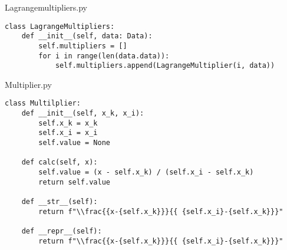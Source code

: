 \documentclass[12pt]{article}
\begin{document}
Lagrangemultipliers.py
\begin{lstlisting}[frame=single]
class LagrangeMultipliers:
    def __init__(self, data: Data):
        self.multipliers = []
        for i in range(len(data.data)):
            self.multipliers.append(LagrangeMultiplier(i, data))
\end{lstlisting}

Multiplier.py
\begin{lstlisting}[frame=single]
class Multilplier:
    def __init__(self, x_k, x_i):
        self.x_k = x_k
        self.x_i = x_i
        self.value = None

    def calc(self, x):
        self.value = (x - self.x_k) / (self.x_i - self.x_k)
        return self.value

    def __str__(self):
        return f"\\frac{{x-{self.x_k}}}{{ {self.x_i}-{self.x_k}}}"

    def __repr__(self):
        return f"\\frac{{x-{self.x_k}}}{{ {self.x_i}-{self.x_k}}}"
\end{lstlisting}
\end{document}
